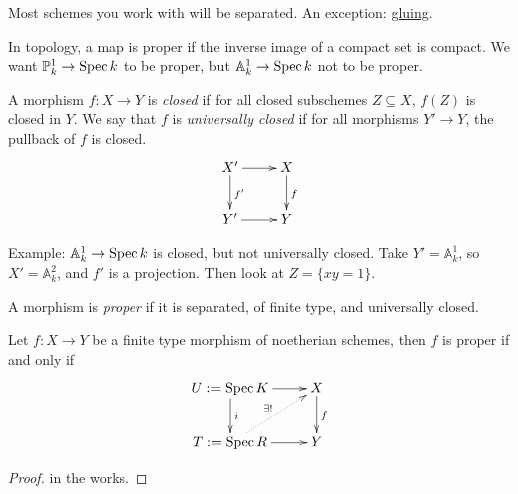 \begin{corollary}
Most schemes you work with will be separated.  An exception:
\underline{gluing}.
\end{corollary}

 In topology, a map is proper if the inverse
image of a compact set is compact.  We want $\mathbb{P}^1_k\to \text{\rm Spec\,} k$ to
be proper, but $\mathbb{A}^1_k\to \text{\rm Spec\,} k$ not to be proper.

\begin{definition}
A morphism $f:X\to Y$ is \emph{closed} if for all closed
subschemes $Z\subseteq X$, $f(Z)$ is closed in $Y$.  We say that
$f$ is \emph{universally closed} if for all morphisms $Y'\to Y$,
the pullback of $f$ is closed.
\[\xymatrix{
 X'\ar[d]^{f'} \ar[r] & X\ar[d]^f\\
 Y'\ar[r] & Y
}\]
\end{definition}

Example: $\mathbb{A}^1_k\to \text{\rm Spec\,} k$ is closed, but not
universally closed.  Take $Y'= \mathbb{A}^1_k$, so $X' =
\mathbb{A}^2_k$, and $f'$ is a projection.  Then look at
$Z=\{xy=1\}$.

\begin{definition}
A morphism is \emph{proper} if it is separated, of finite type,
and universally closed.
\end{definition}

\begin{theorem}
 Let $f:X\to Y$ be a
finite type morphism of noetherian schemes, then $f$ is proper if
and only if
\[\xymatrix{
 U:= \spec K \ar[r] \ar[d]^i & X\ar[d]^f\\
 T:= \spec R \ar[r] \ar@{.>}[ur]^{\exists !} & Y
}\]
\end{theorem}
\begin{proof}
in the works.
\end{proof}
